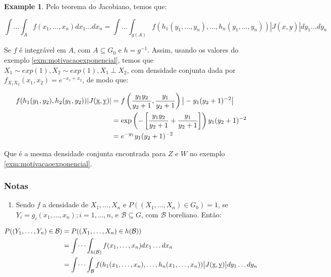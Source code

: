 \documentclass[
]{article}
\providecommand{\tightlist}{%
  \setlength{\itemsep}{0pt}\setlength{\parskip}{0pt}}
\theoremstyle{definition}
\theoremstyle{definition}
\newtheorem{example}{Example}[section]
\theoremstyle{definition}
\theoremstyle{definition}
\theoremstyle{remark}
\begin{document}
\begin{example}
Pelo teorema do Jacobiano, temos que:

\begin{equation*}
\int \ldots \int_{A}f(x_{1}, \ldots, x_{n})dx_{1} \ldots dx_{n} = \int \ldots \int_{g(A)}f(h_{1}(y_{1}, \ldots, y_{n}), \ldots , h_{n}(y_{1}, \ldots, y_{n}))|J(\underbar{x}, \underbar{y})|dy_{1} \ldots dy_{n}
\end{equation*}

Se \(f\) é integrável em \(A\), com \(A \subseteq G_{0}\) e \(h = g^{-1}\). Assim, usando os valores do exemplo \ref{exm:motivacaoexponencial}, temos que \(X_{1} \sim exp(1), X_{2} \sim exp(1), X_{1} \perp X_{2}\), com densidade conjunta dada por \(f_{X_{1}X_{2}}(x_{1},x_{2}) = e^{-x_{1} + x_{2}}\), de modo que:

\begin{align*}
f(h_{1}(y_{1},y_{2}),h_{2}(y_{1},y_{2}))|J(\underbar{x},\underbar{y})| &= f\left(\frac{y_{1}y_{2}}{y_{2} + 1},\frac{y_{1}}{y_{2} + 1}\right)\big{|}-y_{1}(y_{2} + 1)^{-2}\big{|} \\
&= \exp\left(-\left[\frac{y_{1}y_{2}}{y_{2} + 1}+\frac{y_{1}}{y_{2} + 1}\right]\right)y_{1}(y_{2} + 1)^{-2} \\
&= e^{-y_{1}}y_{1}(y_{2} + 1)^{-2}
\end{align*}

Que é a mesma densidade conjunta encontrada para \(Z\) e \(W\) no exemplo \ref{exm:motivacaoexponencial}.
\end{example}

\hypertarget{notas}{%
\subsubsection{Notas}\label{notas}}

\begin{enumerate}
\def\labelenumi{\arabic{enumi}.}
\tightlist
\item
  Sendo \(f\) a densidade de \(X_{1}, \ldots, X_{n}\) e \(P((X_{1}, \ldots, X_{n}) \in G_{0}) = 1\), se \(Y_{i} = g_{i}(x_{1}, \ldots, x_{n}); i = 1, \ldots, n\), e \(\mathcal{B} \subseteq G\), com \(\mathcal{B}\) boreliano. Então:
\end{enumerate}

\begin{align*}
P((Y_{1},\ldots,Y_{n}) \in \mathcal{B}) &= P((X_{1}, \ldots, X_{n}) \in h(\mathcal{B})) \\
&= \int \dots \int_{h(\mathcal{B})}f(x_{1},\ldots,x_{n})dx_{1} \ldots dx_{n} \\
&= \int \dots \int_{\mathcal{B}}f(h_{1}(x_{1}, \ldots, x_{n}),\ldots,h_{n}(x_{1},\ldots,x_{n}))\big{|}J(\underbar{x},\underbar{y})\big{|}dy_{1} \ldots dy_{n}
\end{align*}
\end{document}
